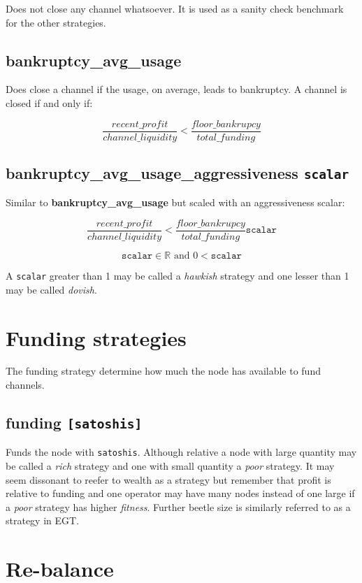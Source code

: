 Does not close any channel whatsoever. It is used as a sanity check benchmark for the other strategies.

\subsection*{bankruptcy\_avg\_usage}

Does close a channel if the usage, on average, leads to bankruptcy. A channel is closed if and only if:

\[ \frac{recent\_profit}{channel\_liquidity} < \frac{floor\_bankrupcy}{total\_funding} \]
 
\subsection*{bankruptcy\_avg\_usage\_aggressiveness \texttt{scalar}}

Similar to \textbf{bankruptcy\_avg\_usage} but scaled with an aggressiveness scalar:

\[ \frac{recent\_profit}{channel\_liquidity} < \frac{floor\_bankrupcy}{total\_funding} \texttt{scalar} \]

\[ \texttt{scalar} \in \mathbb{R} \text{ and } 0 < \texttt{scalar}  \]

A \texttt{scalar} greater than 1 may be called a \textit{hawkish} strategy and one lesser than 1 may be called \textit{dovish}.

\section*{Funding strategies}

The funding strategy determine how much the node has available to fund channels.

\subsection*{funding \texttt{[satoshis]}}

Funds the node with \texttt{satoshis}. Although relative a node with large quantity may be called a \textit{rich} strategy and
one with small quantity a \textit{poor} strategy. It may seem dissonant to reefer to wealth as a strategy but remember 
that profit is relative to funding and one operator may have many nodes instead of one large if a \textit{poor} strategy
has higher \textit{fitness}. Further beetle size is similarly referred to as a strategy in EGT.

\section*{Re-balance}

